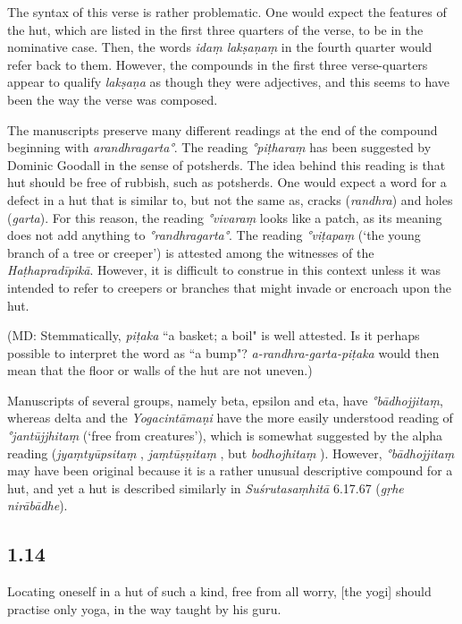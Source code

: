 \begin{ekdosis}
\begin{testimonia}[hp01_013]
\end{testimonia}

\begin{philcomm}[hp01_013]  
The syntax of this verse is rather problematic. One would expect the features of the hut, which are listed in the first three quarters of the verse, to be in the nominative case. Then, the words \emph{idaṃ lakṣaṇaṃ} in the fourth quarter would refer back to them. However, the compounds in the first three verse-quarters appear to qualify \emph{lakṣaṇa} as though they were adjectives, and this seems to have been the way the verse was composed.     

The manuscripts preserve many different readings at the end of the compound beginning with \emph{arandhragarta°}. The reading \emph{°piṭharaṃ} has been suggested by Dominic Goodall in the sense of potsherds. The idea behind this reading is that hut should be free of rubbish, such as potsherds. One would expect a word for a defect in a hut that is similar to, but not the same as, cracks (\emph{randhra}) and holes (\emph{garta}). For this reason, the reading \emph{°vivaraṃ} looks like a patch, as its meaning does not add anything to \emph{°randhragarta°}. The reading \emph{°viṭapaṃ} (`the young branch of a tree or creeper') is attested among the witnesses of the \emph{Haṭhapradīpikā}. However, it is difficult to construe in this context unless it was intended to refer to creepers or branches that might invade or encroach upon the hut.

(MD: Stemmatically, \emph{piṭaka} ``a basket; a boil" is well attested. Is it perhaps possible to interpret the word as ``a bump"? \emph{a-randhra-garta-piṭaka} would then mean that the floor or walls of the hut are not uneven.)

Manuscripts of several groups, namely beta, epsilon and eta, have \emph{°bādhojjitaṃ}, whereas delta and the \emph{Yogacintāmaṇi} have the more easily understood reading of \emph{°jantūjjhitaṃ} (‘free from creatures’), which is somewhat suggested by the alpha reading (\emph{jyaṃtyūpsitaṃ} , \emph{jaṃtūṣṇitaṃ} , but \emph{bodhojhitaṃ} ). However, \emph{°bādhojjitaṃ} may have been original because it is a rather unusual descriptive compound for a hut, and yet a hut is described similarly in \emph{Suśrutasaṃhitā} 6.17.67 (\emph{gṛhe nirābādhe}).

\end{philcomm}

\subsection*{1.14}
\begin{translation}[hp01_014]
Locating oneself in a hut of such a kind, free from all worry, [the yogi] should practise only yoga, in the way taught by his guru.
\end{translation}


\end{ekdosis}
